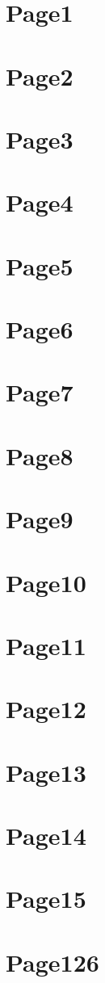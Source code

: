 \documentclass[]{ctexart}
\begin{document}
    \section{Page1} \lipsum[1-1] \newpage
    \section{Page2} \lipsum[2-2] \newpage
    \section{Page3} \lipsum[3-3] \newpage
    \section{Page4} \lipsum[4-4] \newpage
    \section{Page5} \lipsum[1-1] \newpage
    \section{Page6} \lipsum[2-2] \newpage
    \section{Page7} \lipsum[3-3] \newpage
    \section{Page8} \lipsum[4-4] \newpage
    \section{Page9} \lipsum[1-1] \newpage
    \section{Page10} \lipsum[2-2] \newpage
    \section{Page11} \lipsum[3-3] \newpage
    \section{Page12} \lipsum[4-4] \newpage
    \section{Page13} \lipsum[1-1] \newpage
    \section{Page14} \lipsum[2-2] \newpage
    \section{Page15} \lipsum[3-3] \newpage
    \section{Page126} \lipsum[4-4] \newpage
\end{document}
